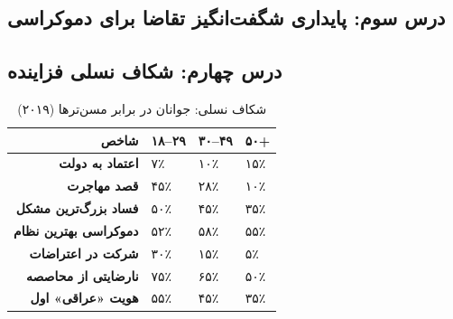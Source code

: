 \subsection{درس سوم: پایداری شگفت‌انگیز تقاضا برای دموکراسی}



\subsection{درس چهارم: شکاف نسلی فزاینده}

\begin{table}[H]
\centering
\caption{شکاف نسلی: جوانان در برابر مسن‌ترها (۲۰۱۹)}
\label{tab:generation-gap}
\begin{tabularx}{\textwidth}{>{\bfseries\small}r >{\centering\arraybackslash\small}X >{\centering\arraybackslash\small}X >{\centering\arraybackslash\small}X}
\toprule
\textbf{شاخص} & \textbf{۱۸–۲۹} & \textbf{۳۰–۴۹} & \textbf{۵۰+} \\
\midrule
اعتماد به دولت          & ۷٪  & ۱۰٪ & ۱۵٪ \\
قصد مهاجرت              & ۴۵٪ & ۲۸٪ & ۱۰٪ \\
فساد بزرگ‌ترین مشکل     & ۵۰٪ & ۴۵٪ & ۳۵٪ \\
دموکراسی بهترین نظام    & ۵۲٪ & ۵۸٪ & ۵۵٪ \\
شرکت در اعتراضات        & ۳۰٪ & ۱۵٪ & ۵٪  \\
نارضایتی از محاصصه      & ۷۵٪ & ۶۵٪ & ۵۰٪ \\
هویت «عراقی» اول         & ۵۵٪ & ۴۵٪ & ۳۵٪ \\
\bottomrule
\end{tabularx}
\end{table}

